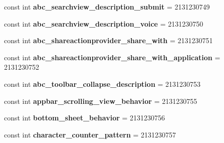 \begin{DoxyCompactItemize}
\item 
\mbox{\label{class_pinned_app_1_1_droid_1_1_resource_1_1_string_a3540c35eb4d43611a1e7cca16a7efbf1}} 
const int {\bfseries abc\+\_\+searchview\+\_\+description\+\_\+submit} = 2131230749
\item 
\mbox{\label{class_pinned_app_1_1_droid_1_1_resource_1_1_string_a56423bfd916b00f0e759aff59c3e7012}} 
const int {\bfseries abc\+\_\+searchview\+\_\+description\+\_\+voice} = 2131230750
\item 
\mbox{\label{class_pinned_app_1_1_droid_1_1_resource_1_1_string_a41301bea1314b646e85c686f735ebf4c}} 
const int {\bfseries abc\+\_\+shareactionprovider\+\_\+share\+\_\+with} = 2131230751
\item 
\mbox{\label{class_pinned_app_1_1_droid_1_1_resource_1_1_string_a5cf378828ceb3558e11f6d7439e23cbb}} 
const int {\bfseries abc\+\_\+shareactionprovider\+\_\+share\+\_\+with\+\_\+application} = 2131230752
\item 
\mbox{\label{class_pinned_app_1_1_droid_1_1_resource_1_1_string_a2c4e7fc85c14fe9ccafcc8f275834e16}} 
const int {\bfseries abc\+\_\+toolbar\+\_\+collapse\+\_\+description} = 2131230753
\item 
\mbox{\label{class_pinned_app_1_1_droid_1_1_resource_1_1_string_a35d39c871e2752ee0b5c329dc3a67f32}} 
const int {\bfseries appbar\+\_\+scrolling\+\_\+view\+\_\+behavior} = 2131230755
\item 
\mbox{\label{class_pinned_app_1_1_droid_1_1_resource_1_1_string_a874d2e2710a66b136057ffe61d7ca70d}} 
const int {\bfseries bottom\+\_\+sheet\+\_\+behavior} = 2131230756
\item 
\mbox{\label{class_pinned_app_1_1_droid_1_1_resource_1_1_string_a68ef5c37ff5b56a20e82664a53eaaacd}} 
const int {\bfseries character\+\_\+counter\+\_\+pattern} = 2131230757

\end{DoxyCompactItemize}
